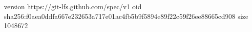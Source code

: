 version https://git-lfs.github.com/spec/v1
oid sha256:f0aea0ddfa667e232653a717e01ac4fb5b9f5894e89f22c59f26ee88665cd908
size 1048672
